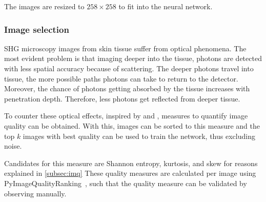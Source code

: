 The images are resized to $258\times258$ to fit into the neural network.

\subsubsection{Image selection}\label{subsec:image-selection}
SHG microscopy images from skin tissue suffer from optical phenomena.
The most evident problem is that imaging deeper into the tissue, photons are detected with less spatial accuracy because of scattering.
The deeper photons travel into tissue, the more possible paths photons can take to return to the detector.
Moreover, the chance of photons getting absorbed by the tissue increases with penetration depth.
Therefore, less photons get reflected from deeper tissue.

To counter these optical effects, inspired by \textcite{Koho2016} and \textcite{Blokker2022}, measures to quantify image quality can be obtained.
With this, images can be sorted to this measure and the top $k$ images with best quality can be used to train the network, thus excluding noise.

Candidates for this measure are Shannon entropy, kurtosis, and skew for reasons explained in \ref{subsec:imq}
These quality measures are calculated per image using PyImageQualityRanking~, such that the quality measure can be validated by observing manually.




